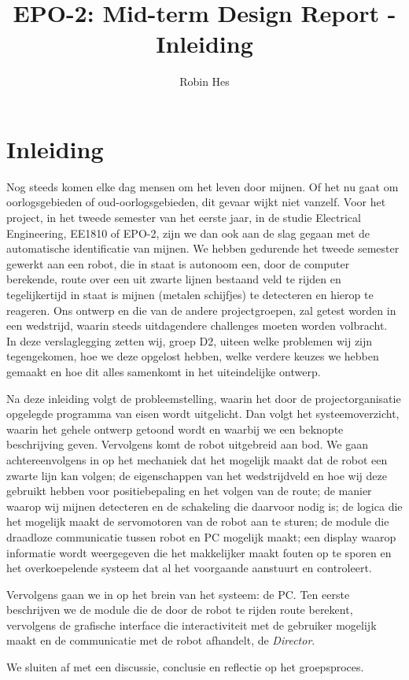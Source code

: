 \documentclass{report}
\title{EPO-2: Mid-term Design Report - Inleiding}
\author{Robin Hes}
\begin{document}
\chapter{Inleiding}
\label{ch:inleiding}

Nog steeds komen elke dag mensen om het leven door mijnen. Of het nu gaat om oorlogsgebieden of oud-oorlogsgebieden, dit gevaar wijkt niet vanzelf. Voor het project, in het tweede semester van het eerste jaar, in de studie Electrical Engineering, EE1810 of EPO-2, zijn we dan ook aan de slag gegaan met de automatische identificatie van mijnen. We hebben gedurende het tweede semester gewerkt aan een robot, die in staat is autonoom een, door de computer berekende, route over een uit zwarte lijnen bestaand veld te rijden en tegelijkertijd in staat is mijnen (metalen schijfjes) te detecteren en hierop te reageren. Ons ontwerp en die van de andere projectgroepen, zal getest worden in een wedstrijd, waarin steeds uitdagendere challenges moeten worden volbracht.
\\

\noindent
In deze verslaglegging zetten wij, groep D2, uiteen welke problemen wij zijn tegengekomen, hoe we deze opgelost hebben, welke verdere keuzes we hebben gemaakt en hoe dit alles samenkomt in het uiteindelijke ontwerp.

Na deze inleiding volgt de probleemstelling, waarin het door de projectorganisatie opgelegde programma van eisen wordt uitgelicht. Dan volgt het systeemoverzicht, waarin het gehele ontwerp getoond wordt en waarbij we een beknopte beschrijving geven.
Vervolgens komt de robot uitgebreid aan bod. We gaan achtereenvolgens in op het mechaniek dat het mogelijk maakt dat de robot een zwarte lijn kan volgen; de eigenschappen van het wedstrijdveld en hoe wij deze gebruikt hebben voor positiebepaling en het volgen van de route; de manier waarop wij mijnen detecteren en de schakeling die daarvoor nodig is; de logica die het mogelijk maakt de servomotoren van de robot aan te sturen; de module die draadloze communicatie tussen robot en PC mogelijk maakt; een display waarop informatie wordt weergegeven die het makkelijker maakt fouten op te sporen en het overkoepelende systeem dat al het voorgaande aanstuurt en controleert.

Vervolgens gaan we in op het brein van het systeem: de PC. Ten eerste beschrijven we de module die de door de robot te rijden route berekent, vervolgens de  grafische interface die interactiviteit met de gebruiker mogelijk maakt en de communicatie met de robot afhandelt, de \textit{Director}.

We sluiten af met een discussie, conclusie en reflectie op het groepsproces.
\end{document}
